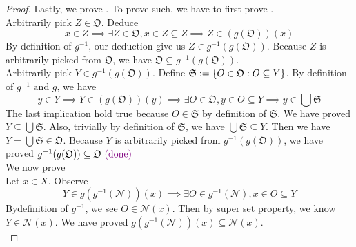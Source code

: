 \documentclass{report}
\begin{document}
\begin{proof}
Lastly, we prove . To prove such, we have to first prove . \\


Arbitrarily pick $Z\in \mathfrak{O}$. Deduce 
\begin{equation}
x\in Z \implies \exists Z\in \mathfrak{O},x \in Z\subseteq Z\implies Z\in (g(\mathfrak{O}))(x)
\end{equation}
By definition of $g^{-1}$, our deduction give us $Z\in g^{-1}(g(\mathfrak{O}))$. Because $Z$ is arbitrarily picked from  $\mathfrak{O}$, we have $\mathfrak{O}\subseteq g^{-1}(g(\mathfrak{O}))$.\\

Arbitrarily pick $Y \in g^{-1}(g(\mathfrak{O}))$. Define $\mathfrak{S}:=\{ O\in \mathfrak{O}: O \subseteq Y \}$. By definition of $g^{-1}\text{ and }g$, we have
\begin{equation}
y \in Y\implies Y \in (g(\mathfrak{O}))(y)\implies \exists O\in\mathfrak{O}, y \in O\subseteq Y\implies y \in \bigcup \mathfrak{S}
\end{equation}
The last implication hold true because $O\in \mathfrak{S}$ by definition of $\mathfrak{S}$. We have proved $Y\subseteq \bigcup \mathfrak{S}$. Also, trivially by definition of  $\mathfrak{S}$, we have $\bigcup \mathfrak{S}\subseteq Y$. Then we have $Y=\bigcup \mathfrak{S} \in \mathfrak{O}$. Because $Y$ is arbitrarily picked from $g^{-1}(g(\mathfrak{O}))$, we have proved $g^{-1}(g(\mathfrak{O}))\subseteq \mathfrak{O}\textcolor{violet}{\text{ (done) }}$\\

We now prove \\

Let $x\in X$. Observe
\begin{equation}
Y \in g(g^{-1}(\mathcal{N}))(x)\implies \exists O \in g^{-1}(\mathcal{N}),x \in O \subseteq Y
\end{equation}
Bydefinition of $g^{-1}$, we see $O\in \mathcal{N}(x)$. Then by super set property, we know $Y \in \mathcal{N}(x)$. We have proved $ g(g^{-1}(\mathcal{N}))(x)\subseteq \mathcal{N}(x)$.\\


\end{proof}
\end{document}
